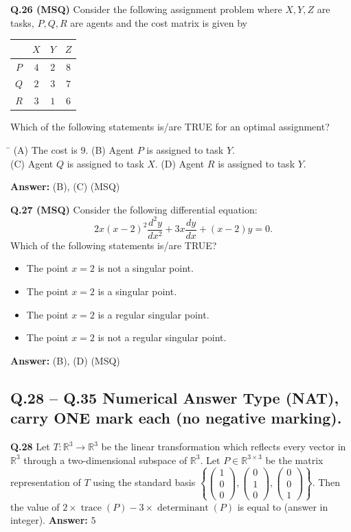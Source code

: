 \documentclass[11pt,a4paper]{article}
\newcommand{\optsfourA}[4]{%
  \begin{tabbing}
    \hspace{0.48\linewidth}\=\kill
    (A) #1 \> (B) #2 \\[2pt]
    (C) #3 \> (D) #4
  \end{tabbing}%
}
\newcommand{\optslistA}[4]{%
  \begin{itemize}
    \setlength{\itemsep}{2pt}\setlength{\parskip}{0pt}
    \item[(A)] #1
    \item[(B)] #2
    \item[(C)] #3
    \item[(D)] #4
  \end{itemize}%
}
\newcommand{\ans}[1]{\textbf{Answer:} #1\par\medskip}
\begin{document}
\textbf{Q.26 (MSQ)} Consider the following assignment problem where $X, Y, Z$ are tasks, $P, Q, R$ are agents and the cost matrix is given by
\begin{center}
\begin{tabular}{cccc}
\toprule
& $X$ & $Y$ & $Z$ \\
\midrule
$P$ & $4$ & $2$ & $8$ \\
$Q$ & $2$ & $3$ & $7$ \\
$R$ & $3$ & $1$ & $6$ \\
\bottomrule
\end{tabular}
\end{center}
Which of the following statements is/are TRUE for an optimal assignment?
\optsfourA{The cost is $9$.}{Agent $P$ is assigned to task $Y$.}{Agent $Q$ is assigned to task $X$.}{Agent $R$ is assigned to task $Y$.}
\ans{(B), (C) (MSQ)}

\textbf{Q.27 (MSQ)} Consider the following differential equation:
\[
  2x(x - 2)^2 \frac{d^2 y}{dx^2} + 3x \frac{dy}{dx} + (x - 2)y = 0.
\]
Which of the following statements is/are TRUE?
\optslistA{The point $x = 2$ is not a singular point.}{The point $x = 2$ is a singular point.}{The point $x = 2$ is a regular singular point.}{The point $x = 2$ is not a regular singular point.}
\ans{(B), (D) (MSQ)}

\subsection*{Q.28 -- Q.35 Numerical Answer Type (NAT), carry ONE mark each (no negative marking).}

\textbf{Q.28} Let $T : \mathbb{R}^3 \to \mathbb{R}^3$ be the linear transformation which reflects every vector in $\mathbb{R}^3$ through a two-dimensional subspace of $\mathbb{R}^3$. Let $P \in \mathbb{R}^{3 \times 3}$ be the matrix representation of $T$ using the standard basis $\left\{\begin{pmatrix} 1 \\ 0 \\ 0 \end{pmatrix}, \begin{pmatrix} 0 \\ 1 \\ 0 \end{pmatrix}, \begin{pmatrix} 0 \\ 0 \\ 1 \end{pmatrix}\right\}$. Then the value of $2 \times \operatorname{trace}(P) - 3 \times \operatorname{determinant}(P)$ is equal to \underline{\hspace{2cm}} (answer in integer).
\ans{$5$}
\end{document}
